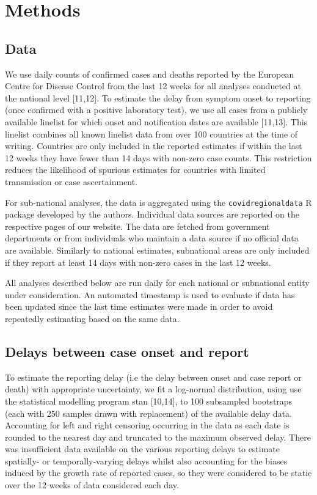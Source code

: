 \documentclass[
]{article}
\begin{document}
\hypertarget{methods}{%
\section{Methods}\label{methods}}

\hypertarget{data}{%
\subsection{Data}\label{data}}

We use daily counts of confirmed cases and deaths reported by the
European Centre for Disease Control from the last 12 weeks for all
analyses conducted at the national level {[}11,12{]}. To estimate the
delay from symptom onset to reporting (once confirmed with a positive
laboratory test), we use all cases from a publicly available linelist
for which onset and notification dates are available {[}11,13{]}. This
linelist combines all known linelist data from over 100 countries at the
time of writing. Countries are only included in the reported estimates
if within the last 12 weeks they have fewer than 14 days with non-zero
case counts. This restriction reduces the likelihood of spurious
estimates for countries with limited transmission or case ascertainment.

For sub-national analyses, the data is aggregated using the
\texttt{covidregionaldata} R package developed by the authors.
Individual data sources are reported on the respective pages of our
website. The data are fetched from government departments or from
individuals who maintain a data source if no official data are
available. Similarly to national estimates, subnational areas are only
included if they report at least 14 days with non-zero cases in the last
12 weeks.

All analyses described below are run daily for each national or
subnational entity under consideration. An automated timestamp is used
to evaluate if data has been updated since the last time estimates were
made in order to avoid repeatedly estimating based on the same data.

\hypertarget{delays-between-case-onset-and-report}{%
\subsection{Delays between case onset and
report}\label{delays-between-case-onset-and-report}}

To estimate the reporting delay (i.e the delay between onset and case
report or death) with appropriate uncertainty, we fit a log-normal
distribution, using use the statistical modelling program stan
{[}10,14{]}, to 100 subsampled bootstraps (each with 250 samples drawn
with replacement) of the available delay data. Accounting for left and
right censoring occurring in the data as each date is rounded to the
nearest day and truncated to the maximum observed delay. There was
insufficient data available on the various reporting delays to estimate
spatially- or temporally-varying delays whilst also accounting for the
biases induced by the growth rate of reported cases, so they were
considered to be static over the 12 weeks of data considered each day.
\end{document}

